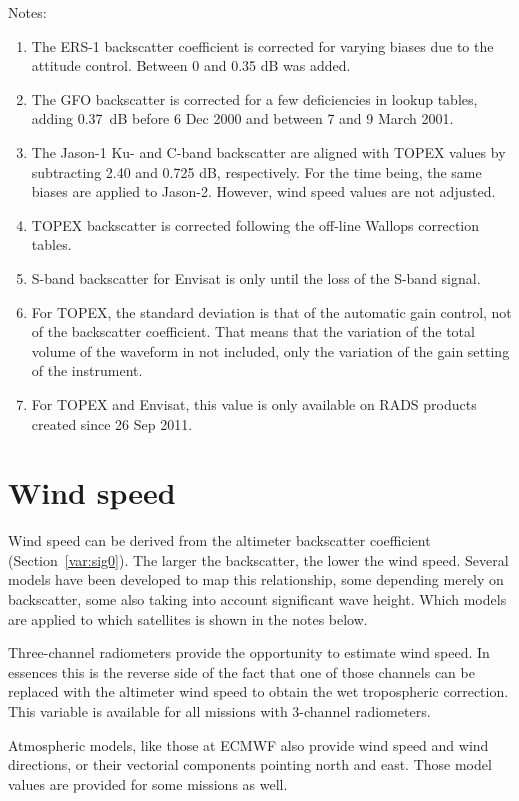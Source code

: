 \documentclass[a4paper,11pt,openany,natbib]{thesis}
\begin{document}
Notes:
\begin{enumerate}
\item The ERS-1 backscatter coefficient is corrected for varying biases due to the attitude control. Between 0 and 0.35 dB was added.
\item The GFO backscatter is corrected for a few deficiencies in lookup tables, adding 0.37~dB before 6 Dec 2000 and between 7 and 9 March 2001.
\item The Jason-1 Ku- and C-band backscatter are aligned with TOPEX values by subtracting 2.40 and 0.725 dB, respectively. For the time being, the same biases are applied to Jason-2. However, wind speed values are not adjusted.
\item TOPEX backscatter is corrected following the off-line Wallops correction tables.
\item S-band backscatter for Envisat is only until the loss of the S-band signal.
\item For TOPEX, the standard deviation is that of the automatic gain control, not of the backscatter coefficient. That means that the variation of the total volume of the waveform in not included, only the variation of the gain setting of the instrument.
\item For TOPEX and Envisat, this value is only available on RADS products created since 26 Sep 2011.
\end{enumerate}

\section{Wind speed}
\label{var:wind}
Wind speed can be derived from the altimeter backscatter coefficient (Section~\ref{var:sig0}). The larger the backscatter, the lower the wind speed. Several models have been developed to map this relationship, some depending merely on backscatter, some also taking into account significant wave height. Which models are applied to which satellites is shown in the notes below.

Three-channel radiometers provide the opportunity to estimate wind speed. In essences this is the reverse side of the fact that one of those channels can be replaced with the altimeter wind speed to obtain the wet tropospheric correction. This variable is available for all missions with 3-channel radiometers.

Atmospheric models, like those at ECMWF also provide wind speed and wind directions, or their vectorial components pointing north and east. Those model values are provided for some missions as well.
\end{document}
